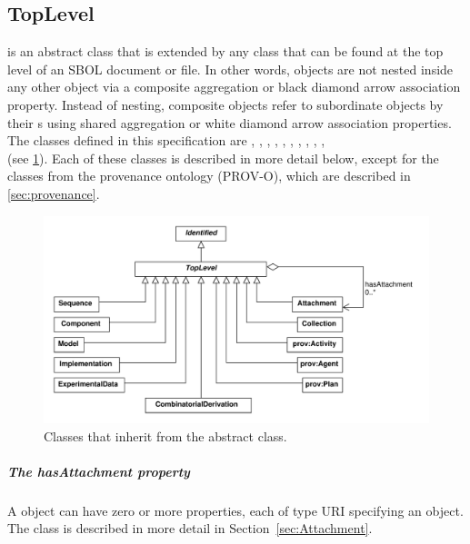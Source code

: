 \subsection {TopLevel}
\label{sec:TopLevel}
 is an abstract class that is extended by any  class that can be found at the top level of an SBOL document or file. In other words,  objects are not nested inside any other object via a composite aggregation or black diamond arrow association property. Instead of nesting, composite  objects refer to subordinate  objects by their s using shared aggregation or white diamond arrow association properties. The  classes defined in this specification are , , , , , , , , , , \\
 (see \ref{uml:toplevel}).  Each of these classes is described in more detail below, except for the classes from the provenance ontology (PROV-O), which are described in \ref{sec:provenance}.


\begin{figure}[ht]
\begin{center}
\includegraphics[width=\textwidth]{uml/toplevel}
\caption[]{Classes that inherit from the  abstract class.}
\label{uml:toplevel}
\end{center}
\end{figure}


\subparagraph{The hasAttachment property}
\label{sec:hasAttachment}
A  object can have zero or more  properties, each of type URI specifying an  object. The  class is described in more detail in Section~\ref{sec:Attachment}.

